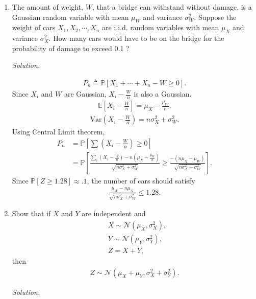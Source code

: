 \documentclass{article}
\begin{document}
\begin{enumerate}
\item The amount of weight, $W$, that a bridge can withstand without damage, is a Gaussian random variable with mean $\mu_W$ and variance $\sigma_W^2$. 
Suppose the weight of cars $X_1,X_2,\cdots,X_n$ are i.i.d. random variables with mean $\mu_X$ and variance $\sigma_X^2$.
How many cars would have to be on the bridge for the probability of damage to exceed 0.1 ?

\emph{Solution.}

	\begin{align*}
	P_n\triangleq \mathbb{P}[X_1+\cdots+X_n-W\geq 0].	
	\end{align*}
Since $X_i$ and $W$ are Gaussian, $X_i-\frac{W}{n}$ is also a Gaussian.
	\begin{align*}
	\mathbb{E}\left[X_i-\frac{W}{n}\right]=\mu_X-\frac{\mu_W}{n}.	
	\end{align*}
	\begin{align*}
	\text{Var}\left(X_i-\frac{W}{n}\right)=n\sigma_X^2+\sigma_W^2.	
	\end{align*}
Using Central Limit theorem,
	\begin{align*}
	P_n&=\mathbb{P}\left[ \sum \left(X_i-\frac{W}{n}\right)\geq 0\right] \\&=\mathbb{P}\left[ \frac{\sum_i \left(X_i-\frac{W}{n}\right)-n\left(\mu_X-\frac{\mu_W}{n}\right)}{\sqrt{n\sigma_X^2+\sigma_W^2}}\geq \frac{-\left(n\mu_X-\mu_W\right)}{\sqrt{n\sigma_X^2+\sigma_W^2}}\right].	
	\end{align*}
Since $\mathbb{P}[Z\geq 1.28]\approx .1$, the number of cars should satisfy	\begin{align*}
	\frac{\mu_W-n\mu_X}{\sqrt{n\sigma_X^2+\sigma_W^2}}	\leq 1.28.
	\end{align*}


\item Show that if $X$ and $Y$ are independent and 
	\begin{align*}
	&X\sim\mathcal{N}(\mu_X,\sigma_X^2),\\
	&Y\sim\mathcal{N}(\mu_Y,\sigma_Y^2),\\
	&Z=X+Y,	
	\end{align*}
then 
	\begin{align*}
	Z\sim\mathcal{N}(\mu_X+\mu_Y,\sigma_X^2+\sigma_Y^2).	
	\end{align*}

\emph{Solution.}


\end{enumerate}
\end{document}
